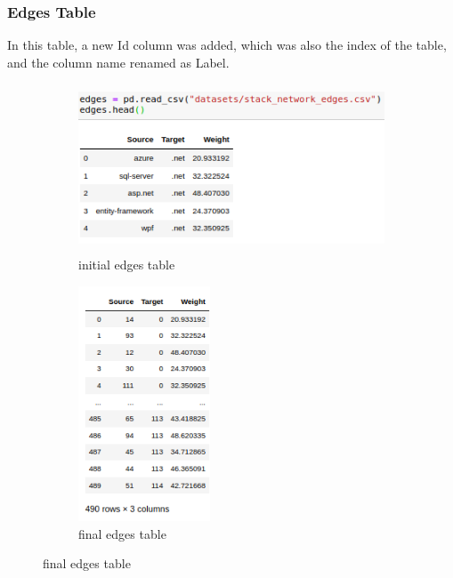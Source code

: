 \documentclass[12pt]{article}
\begin{document}
		\subsubsection{Edges Table}
			In this table, a new Id column was added, which was also the index of the table, and the column name renamed as Label.
			\begin{figure}[ht]
				\begin{subfigure}[b]{0.5\textwidth}
					\includegraphics[width=\textwidth,height=5cm]{edgesinit}
					\caption{initial edges table}
					\label{fig:1}
				\end{subfigure}
				\hfill 
				\begin{subfigure}[b]{0.4\textwidth}
					\includegraphics[width=\textwidth,height=7cm]{edgesfinal}
					\caption{final edges  table}
					\label{fig:2}
				\end{subfigure}
			\end{figure}
		\FloatBarrier
	
\end{document}
